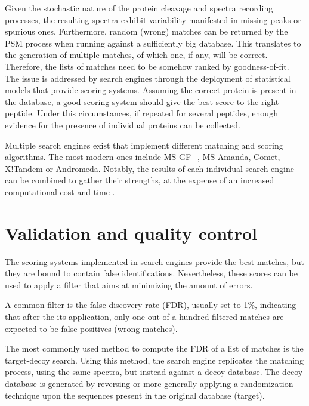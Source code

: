 \documentclass[11pt, a4paper]{report}
\begin{document}

Given the stochastic nature of the protein cleavage and spectra recording processes, the resulting spectra exhibit variability manifested in missing peaks or spurious ones. Furthermore, random (wrong) matches can be returned by the PSM process when running against a sufficiently big database. This translates to the generation of multiple matches, of which one, if any, will be correct. Therefore, the lists of matches need to be somehow ranked by goodness-of-fit. The issue is addressed by search engines through the deployment of statistical models that provide scoring systems. Assuming the correct protein is present in the database, a good scoring system should give the best score to the right peptide. Under this circumstances, if repeated for several peptides, enough evidence for the presence of individual proteins can be collected.

Multiple search engines exist that implement different matching and scoring algorithms. The most modern ones include MS-GF+, MS-Amanda, Comet, X!Tandem or Andromeda. Notably, the results of each individual search engine can be combined to gather their strengths, at the expense of an increased computational cost and time \cite{Shteynberg2013}.



\section{Validation and quality control}
\label{sec:validation}

The scoring systems implemented in search engines provide the best matches, but they are bound to contain false identifications. Nevertheless, these scores can be used to apply a filter that aims at minimizing the amount of errors.

A common filter is the false discovery rate (FDR), usually set to 1\%, indicating that after the its application, only one out of a hundred filtered matches are expected to be false positives (wrong matches).

The most commonly used method to compute the \ac{FDR} of a list of matches is the target-decoy search. Using this method, the search engine replicates the matching process, using the same spectra, but instead against a decoy database. The decoy database is generated by reversing or more generally applying a randomization technique upon the sequences present in the original database (target). 
\end{document}
